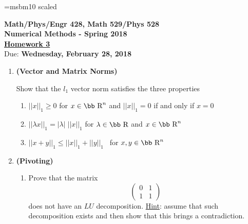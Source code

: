 \documentclass [12pt]{article}
\begin{document}
\def\e{\mathop{\rm e}\nolimits}
\font\bb=msbm10 scaled  %
\def\R{\hbox{\bb R}}

\noindent
\begin{center}
{ \bf  {Math/Phys/Engr 428, Math 529/Phys 528 \\
Numerical Methods - Spring 2018 }}\\[7pt]
\underline{\bf Homework 3}\\

Due: {\bf Wednesday, February 28, 2018}

\end{center}

\begin{enumerate}

\item   \textbf{(Vector and Matrix Norms)}


  Show that the $l_{1}$ vector norm satisfies the three
          properties
          \begin{enumerate}
          \item $||x||_1\geq 0$ for $x \in \R^n$ and  $||x||_1= 0$ if and only if $x=0$
          \item $|| \lambda x||_1 = | \lambda | \; ||x||_1$ for $\lambda \in \R$ and
               $x \in \R^n$
          \item $|| x + y||_1 \leq ||x||_1+||y||_1$ \ for  $x,y \in \R^n$
          \end{enumerate}




\item   \textbf{(Pivoting)}

\begin{enumerate}
\item   Prove that the matrix
$$
\begin{pmatrix} 0 & 1 \\ 1 & 1 \end{pmatrix}
$$
does not have an $LU$ decomposition. \underline{Hint}: assume that such decomposition exists and then show that this brings a contradiction.


\end{enumerate}
\end{enumerate}
\end{document}
